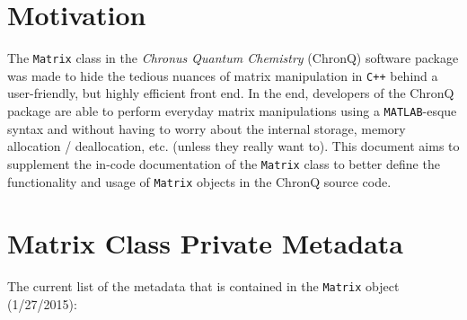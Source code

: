 \documentclass[english,journal=jctcce,manuscript=article,etalmode=truncate,maxauthors=0]{article}
\begin{document}
\section{Motivation}

The \texttt{Matrix} class in the \emph{Chronus Quantum Chemistry} (ChronQ) software package was made to hide the tedious nuances of matrix manipulation in \texttt{C++} behind a user-friendly, but highly efficient front end. In the end, developers of the ChronQ package are able to perform everyday matrix manipulations using a \texttt{MATLAB}-esque syntax and without having to worry about the internal storage, memory allocation / deallocation, etc. (unless they really want to). This document aims to supplement the in-code documentation of the \texttt{Matrix} class to better define the functionality and usage of \texttt{Matrix} objects in the ChronQ source code.

\section{Matrix Class Private Metadata}
The current list of the metadata that is contained in the \texttt{Matrix} object (1/27/2015):
\end{document}
